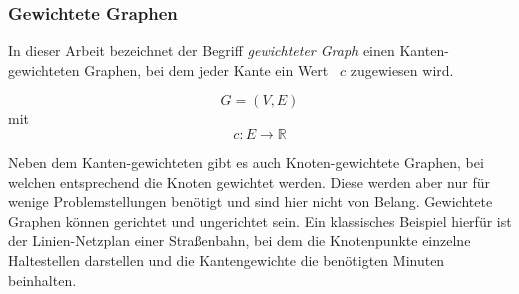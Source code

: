 \documentclass[12pt,a4paper]{article}
\begin{document}
\subsubsection{Gewichtete Graphen}
In dieser Arbeit bezeichnet der Begriff \textit{gewichteter Graph} einen Kanten-gewichteten Graphen, bei dem jeder Kante ein Wert ~$c$ zugewiesen wird.

$$G = (V,E)$$ mit $$c: E \rightarrow \mathbb{R}$$

Neben dem Kanten-gewichteten gibt es auch Knoten-gewichtete Graphen, bei welchen entsprechend die Knoten gewichtet werden. Diese werden aber nur für wenige Problemstellungen benötigt und sind hier nicht von Belang. Gewichtete Graphen können gerichtet und ungerichtet sein. Ein klassisches Beispiel hierfür ist der Linien-Netzplan einer Straßenbahn, bei dem die Knotenpunkte einzelne Haltestellen darstellen und die Kantengewichte die benötigten Minuten beinhalten.
\end{document}
